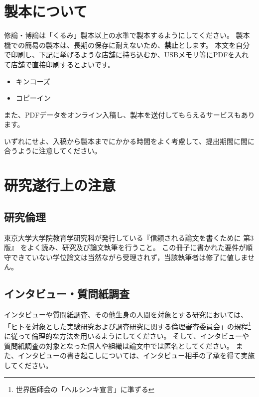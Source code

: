 
\chapter{製本について}
	\label{app:seihon}

	修論・博論は「くるみ」製本以上の水準で製本するようにしてください。
	製本機での簡易の製本は、長期の保存に耐えないため、\textbf{禁止}とします。
	本文を自分で印刷し、下記に挙げるような店舗に持ち込むか、USBメモリ等にPDFを入れて店舗で直接印刷するとよいです。

	\begin{itemize}
		\item キンコーズ
		\item コピーイン
	\end{itemize}

	また、PDFデータをオンライン入稿し、製本を送付してもらえるサービスもあります。

	いずれにせよ、入稿から製本までにかかる時間をよく考慮して、提出期間に間に合うように注意してください。

\chapter{研究遂行上の注意}\label{app:ethic}

	\section{研究倫理}
		\label{sec:echic}

		東京大学大学院教育学研究科が発行している『信頼される論文を書くために 第3版』
		をよく読み、研究及び論文執筆を行うこと。
		この冊子に書かれた要件が順守できていない学位論文は当然ながら受理されず，当該執筆者は修了に値しません。

	\section{インタビュー・質問紙調査}
		\label{sec:interview}

		インタビューや質問紙調査、その他生身の人間を対象とする研究においては、「ヒトを対象とした実験研究および調査研究に関する倫理審査委員会」の規程\footnote{世界医師会の「ヘルシンキ宣言」に準ずる}に従って倫理的な方法を用いるようにしてください。
		そして、インタビューや質問紙調査の対象となった個人や組織は論文中では匿名としてください。
		また、インタビューの書き起こしについては、インタビュー相手の了承を得て実施してください。

